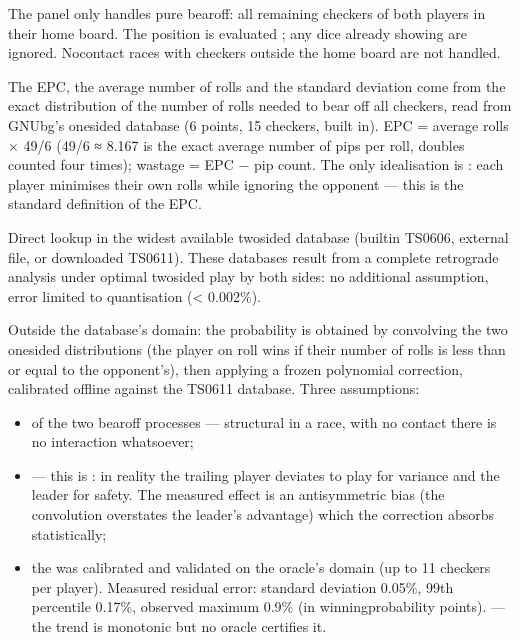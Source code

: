 \documentclass[letterpaper,10pt,english]{sphinxmanual}
\begin{document}
\sphinxAtStartPar
{} The panel only handles pure bearoff: all remaining checkers of both players in their home board. The position is evaluated ; any dice already showing are ignored. No\sphinxhyphen{}contact races with checkers outside the home board are not handled.

\sphinxAtStartPar
{} The EPC, the average number of rolls and the standard deviation come from the exact distribution of the number of rolls needed to bear off all checkers, read from GNUbg’s one\sphinxhyphen{}sided database (6 points, 15 checkers, built in). EPC = average rolls × 49/6 (49/6 ≈ 8.167 is the exact average number of pips per roll, doubles counted four times); wastage = EPC − pip count. The only idealisation is : each player minimises their own rolls while ignoring the opponent — this is the standard definition of the EPC.

\sphinxAtStartPar
{} Direct lookup in the widest available two\sphinxhyphen{}sided database (built\sphinxhyphen{}in TS\sphinxhyphen{}06\sphinxhyphen{}06, external file, or downloaded TS\sphinxhyphen{}06\sphinxhyphen{}11). These databases result from a complete retrograde analysis under optimal two\sphinxhyphen{}sided play by both sides: no additional assumption, error limited to quantisation (< 0.002\%).

\sphinxAtStartPar
{} Outside the database’s domain: the probability is obtained by convolving the two one\sphinxhyphen{}sided distributions (the player on roll wins if their number of rolls is less than or equal to the opponent’s), then applying a frozen polynomial correction, calibrated offline against the TS\sphinxhyphen{}06\sphinxhyphen{}11 database. Three assumptions:
\begin{itemize}
\item {} 
\sphinxAtStartPar
{} of the two bearoff processes — structural in a race, with no contact there is no interaction whatsoever;

\item {} 
\sphinxAtStartPar
{} — this is : in reality the trailing player deviates to play for variance and the leader for safety. The measured effect is an antisymmetric bias (the convolution overstates the leader’s advantage) which the correction absorbs statistically;

\item {} 
\sphinxAtStartPar
the  was calibrated and validated on the oracle’s domain (up to 11 checkers per player). Measured residual error: standard deviation 0.05\%, 99th percentile 0.17\%, observed maximum 0.9\% (in winning\sphinxhyphen{}probability points).  — the trend is monotonic but no oracle certifies it.

\end{itemize}
\end{document}
